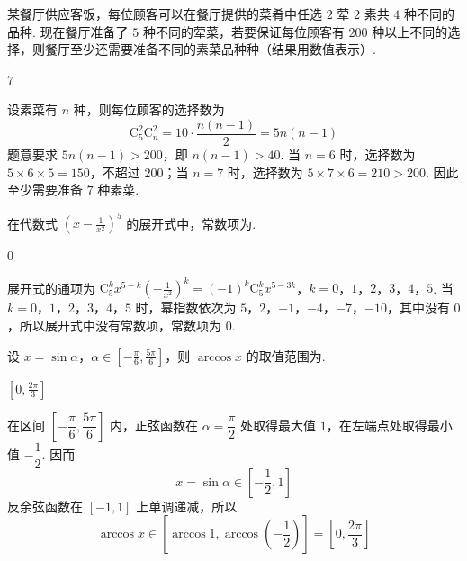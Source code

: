 \begin{problem}
某餐厅供应客饭，每位顾客可以在餐厅提供的菜肴中任选 \(2\) 荤 \(2\) 素共 \(4\) 种不同的品种. 现在餐厅准备了 \(5\) 种不同的荤菜，若要保证每位顾客有 \(200\) 种以上不同的选择，则餐厅至少还需要准备不同的素菜品种\fillinblank{}\(\text{种}\)（结果用数值表示）.
\end{problem}

\begin{answer}
\(7\)
\end{answer}

\begin{solution}
设素菜有 \(n\) 种，则每位顾客的选择数为
\[
\mathrm C_5^2\mathrm C_n^2=10\cdot\frac{n(n-1)}{2}=5n(n-1)
\]
题意要求 \(5n(n-1)>200\)，即 \(n(n-1)>40\). 当 \(n=6\) 时，选择数为 \(5\times6\times5=150\)，不超过 \(200\)；当 \(n=7\) 时，选择数为 \(5\times7\times6=210>200\). 因此至少需要准备 \(7\) 种素菜.
\end{solution}

\begin{problem}
在代数式 \(\left(x-\frac{1}{x^2}\right)^5\) 的展开式中，常数项为\fillinblank{}.
\end{problem}

\begin{answer}
\(0\)
\end{answer}

\begin{solution}
展开式的通项为
\(\mathrm C_5^k x^{5-k}\left(-\frac{1}{x^2}\right)^k=(-1)^k\mathrm C_5^k x^{5-3k}\)，\(k=0\)，\(1\)，\(2\)，\(3\)，\(4\)，\(5\).
当 \(k=0\)，\(1\)，\(2\)，\(3\)，\(4\)，\(5\) 时，幂指数依次为 \(5\)，\(2\)，\(-1\)，\(-4\)，\(-7\)，\(-10\)，其中没有 \(0\)，所以展开式中没有常数项，常数项为 \(0\).
\end{solution}

\begin{problem}
设 \(x=\sin\alpha\)，\(\alpha\in\left[-\frac{\pi}{6},\frac{5\pi}{6}\right]\)，则 \(\arccos x\) 的取值范围为\fillinblank{}.
\end{problem}

\begin{answer}
\(\left[0,\frac{2\pi}{3}\right]\)
\end{answer}

\begin{solution}
在区间 \(\left[-\dfrac\pi6,\dfrac{5\pi}{6}\right]\) 内，正弦函数在 \(\alpha=\dfrac\pi2\) 处取得最大值 \(1\)，在左端点处取得最小值 \(-\dfrac12\). 因而
\[
x=\sin\alpha\in\left[-\frac12,1\right]
\]
反余弦函数在 \([-1,1]\) 上单调递减，所以
\[
\arccos x\in\left[\arccos1,\arccos\left(-\frac12\right)\right]
=\left[0,\frac{2\pi}{3}\right]
\]
\end{solution}

